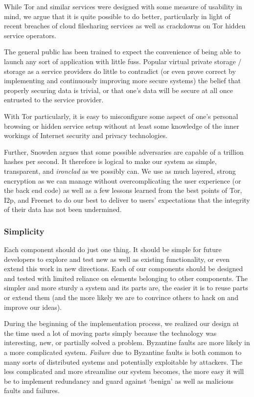 While Tor and similar services were designed with some measure
of usability in mind, we argue that it is quite possible to do
better, particularly in light of recent breaches of cloud
filesharing services as well as crackdowns on Tor hidden service
operators.

The general public has been trained to expect the convenience of
being able to launch any sort of application with little fuss.
Popular virtual private storage / storage as a
service providers do little to contradict (or even prove correct
by implementing and continuously improving more secure systems)
the belief that properly securing data is trivial,
or that one's data will be secure at
all once entrusted to the service provider.

With Tor particularly, it is easy to misconfigure some aspect
of one's personal browsing or hidden service setup without
at least some knowledge of the inner workings of Internet
security and privacy technologies.

Further, Snowden argues that some possible adversaries are
capable of a trillion hashes per second. It therefore is logical
to make our system as simple, transparent, and \textit{ironclad}
as we possibly can. We use as much layered, strong encryption as
we can manage without overcomplicating the user experience (or the
back end code) as well as a few lessons learned from the best
points of Tor, I2p, and Freenet to do our best to deliver to
users' expectations that the integrity of their data has not
been undermined.

\subsubsection*{Simplicity}

Each component should do just one thing. It should be simple
for future developers to explore and test new as well as existing
functionality, or even extend this work in new directions.
Each of our components should be designed and tested with limited
reliance on elements belonging to other components.
The simpler and more sturdy a system and its parts are, the easier
it is to reuse parts or extend them (and the more likely we
are to convince others to hack on and improve our ideas).

During the beginning of the implementation process, we realized
our design at the time used a lot of moving parts simply because
the technology was interesting, new, or partially solved a problem.
Byzantine faults are more likely in a more complicated system.
\textit{Failure} due to Byzantine faults is both common to many
sorts of distributed systems and potentially exploitable by
attackers. The less complicated and more streamline our system
becomes, the more easy it will be to implement redundancy and
guard against `benign' as well as malicious faults and failures.

